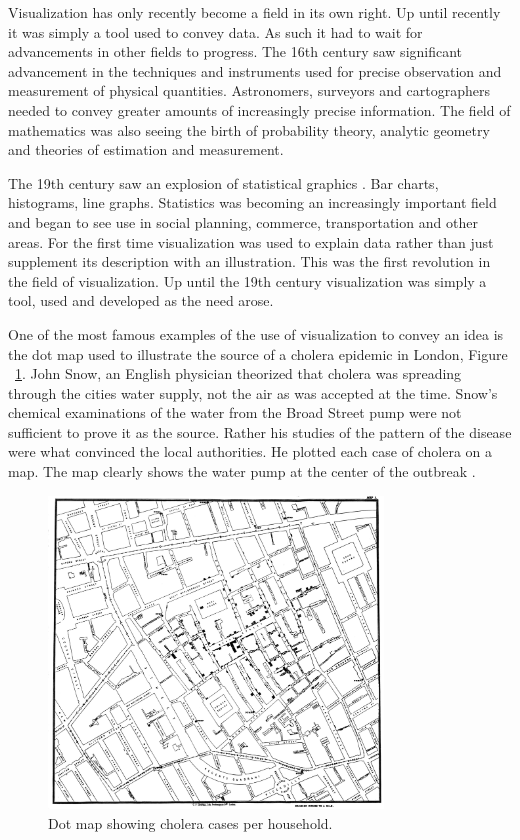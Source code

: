 \documentclass[a4paper, 10pt, titlepage, twocolumn]{article}
\begin{document}
Visualization has only recently become a field in its own right. Up until recently it was simply a tool used to convey data. As such it had to wait for advancements in other fields to progress. The 16th century saw significant advancement in the techniques and instruments used for precise observation and measurement of physical quantities. Astronomers, surveyors and cartographers needed to convey greater amounts of increasingly precise information. The field of mathematics was also seeing the birth of probability theory, analytic geometry and theories of estimation and measurement.

The 19th century saw an explosion of statistical graphics \cite{friendly2001milestones}. Bar charts, histograms, line graphs. Statistics was becoming an increasingly important field and began to see use in social planning, commerce, transportation and other areas. For the first time visualization was used to explain data rather than just supplement its description with an illustration. This was the first revolution in the field of visualization. Up until the 19th century visualization was simply a tool, used and developed as the need arose.

One of the most famous examples of the use of visualization to convey an idea is the dot map used to illustrate the source of a cholera epidemic in London, Figure ~\ref{fig:dot_map}. John Snow, an English physician theorized that cholera was spreading through the cities water supply, not the air as was accepted at the time. Snow's chemical examinations of the water from the Broad Street pump were not sufficient to prove it as the source. Rather his studies of the pattern of the disease were what convinced the local authorities. He plotted each case of cholera on a map. The map clearly shows the water pump at the center of the outbreak \cite{frerichs2007ghost}.


\begin{figure}[hbt]
  \begin{center}
    \includegraphics[width=3.5in]{snow.jpg}
  \end{center}
  \caption{\small Dot map showing cholera cases per household. }
  \label{fig:dot_map}
\end{figure}
\end{document}
